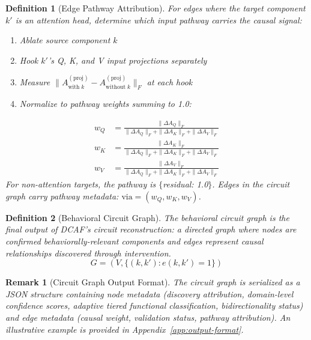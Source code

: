 \documentclass[11pt]{article}
\newtheorem{definition}{Definition}[section]
\newtheorem{remark}{Remark}[section]
\begin{document}
\begin{definition}[Edge Pathway Attribution]
\label{def:edge-pathway-attribution}
For edges where the target component $k'$ is an attention head, determine which input pathway carries the causal signal:
\begin{enumerate}[nosep]
\item Ablate source component $k$
\item Hook $k'$'s Q, K, and V input projections separately
\item Measure $\|A^{(\text{proj})}_{\text{with}\;k} - A^{(\text{proj})}_{\text{without}\;k}\|_F$ at each hook
\item Normalize to pathway weights summing to 1.0:
\end{enumerate}
\begin{align}
w_Q &= \frac{\|\Delta A_Q\|_F}{\|\Delta A_Q\|_F + \|\Delta A_K\|_F + \|\Delta A_V\|_F} \\[0.3em]
w_K &= \frac{\|\Delta A_K\|_F}{\|\Delta A_Q\|_F + \|\Delta A_K\|_F + \|\Delta A_V\|_F} \\[0.3em]
w_V &= \frac{\|\Delta A_V\|_F}{\|\Delta A_Q\|_F + \|\Delta A_K\|_F + \|\Delta A_V\|_F}
\end{align}
For non-attention targets, the pathway is $\{$residual: 1.0$\}$. Edges in the circuit graph carry pathway metadata: $\text{via} = (w_Q, w_K, w_V)$.
\end{definition}

\begin{definition}[Behavioral Circuit Graph]
\label{def:behavioral-circuit-graph}
The behavioral circuit graph is the final output of DCAF's circuit reconstruction: a directed graph where nodes are confirmed behaviorally-relevant components and edges represent causal relationships discovered through intervention.
\begin{equation}
G = \left(V, \{(k, k') : e(k, k') = 1\}\right)
\end{equation}
\end{definition}

\begin{remark}[Circuit Graph Output Format]
\label{rem:circuit-graph-output-format}
The circuit graph is serialized as a JSON structure containing node metadata (discovery attribution, domain-level confidence scores, adaptive tiered functional classification, bidirectionality status) and edge metadata (causal weight, validation status, pathway attribution). An illustrative example is provided in Appendix~\ref{app:output-format}.
\end{remark}
\end{document}
